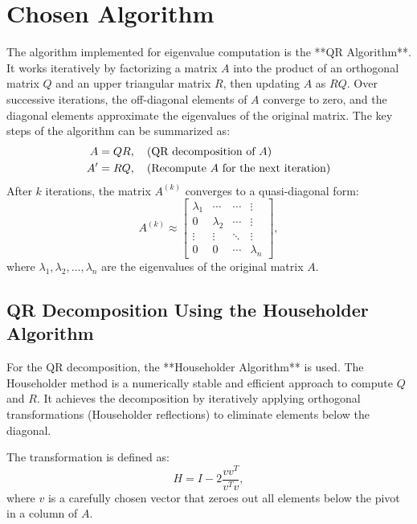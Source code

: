 \documentclass[12pt]{article}
\begin{document}
\section*{Chosen Algorithm}
The algorithm implemented for eigenvalue computation is the **QR Algorithm**. It works iteratively by factorizing a matrix \( A \) into the product of an orthogonal matrix \( Q \) and an upper triangular matrix \( R \), then updating \( A \) as \( RQ \). Over successive iterations, the off-diagonal elements of \( A \) converge to zero, and the diagonal elements approximate the eigenvalues of the original matrix.
The key steps of the algorithm can be summarized as:
\begin{align}
    A &= QR, \quad \text{(QR decomposition of \( A \))} \\
    A' &= RQ, \quad \text{(Recompute \( A \) for the next iteration)}
\end{align}
After \( k \) iterations, the matrix \( A^{(k)} \) converges to a quasi-diagonal form:
\begin{equation}
    A^{(k)} \approx 
    \begin{bmatrix}
        \lambda_1 & \cdots & \cdots & \vdots \\
        0 & \lambda_2 & \cdots & \vdots \\
        \vdots & \vdots & \ddots & \vdots \\
        0 & 0 & \cdots & \lambda_n
    \end{bmatrix},
\end{equation}
where \( \lambda_1, \lambda_2, \dots, \lambda_n \) are the eigenvalues of the original matrix \( A \).

\subsection*{QR Decomposition Using the Householder Algorithm}
For the QR decomposition, the **Householder Algorithm** is used. The Householder method is a numerically stable and efficient approach to compute \( Q \) and \( R \). It achieves the decomposition by iteratively applying orthogonal transformations (Householder reflections) to eliminate elements below the diagonal.

The transformation is defined as:
\begin{equation}
    H = I - 2\frac{vv^T}{v^Tv},
\end{equation}
where \( v \) is a carefully chosen vector that zeroes out all elements below the pivot in a column of \( A \).
\end{document}
